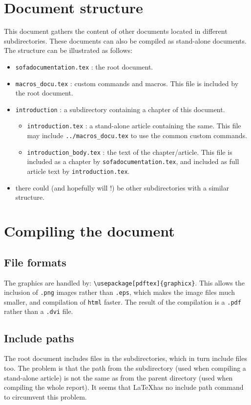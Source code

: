 \documentclass[a4paper,10pt]{report}
\begin{document}
\section{Document structure}
This document gathers the content of other documents located in different subdirectories. These documents can also be compiled as stand-alone documents.
The structure can be illustrated as follows:
\begin{itemize}
 \item \texttt{sofadocumentation.tex} : the root document.
 \item \texttt{macros\_docu.tex} : custom commands and macros. This file is included by the root document.
 \item \texttt{introduction} : a subdirectory containing a chapter of this document.
\begin{itemize}
 \item \texttt{introduction.tex} : a stand-alone article containing the same. This file may include \texttt{../macros\_docu.tex} to use the common custom commands.
 \item \texttt{introduction\_body.tex} : the text of the chapter/article. This file is included as a chapter by \texttt{sofadocumentation.tex}, and included as full article text by \texttt{introduction.tex}.
\end{itemize}
 \item there could (and hopefully will !) be other subdirectories with a similar structure.
\end{itemize}

\section{Compiling the document}
\subsection{File formats}
The graphics are handled by: \texttt{\textbackslash usepackage[pdftex]\{graphicx\}}. This allows the inclusion of \texttt{.png} images rather than \texttt{.eps}, which makes the image files much smaller, and compilation of \texttt{html} faster. The result of the compilation is a \texttt{.pdf} rather than a \texttt{.dvi} file.

\subsection{Include paths}
The root document includes files in the subdirectories, which in turn include files too. The problem is that the path from the subdirectory (used when compiling a stand-alone article) is not the same as from the parent directory (used when compiling the whole report).
It seems that \LaTeX has no include path command to circumvent this problem.
\end{document}
